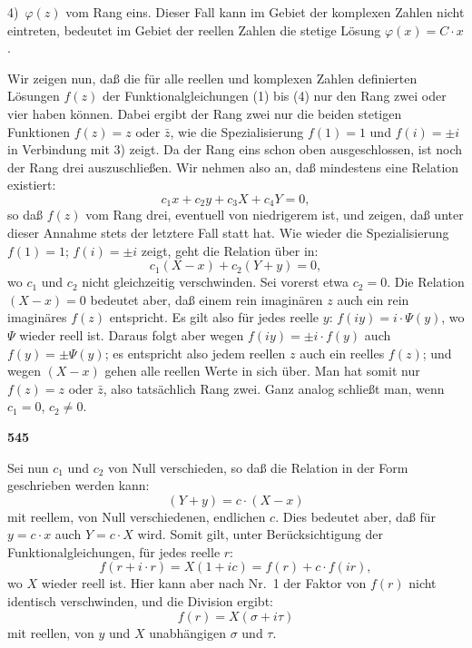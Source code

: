 \documentclass[12pt,a4paper]{article}
\begin{document}
4)\ $\varphi(z)$ vom Rang eins. Dieser Fall kann im Gebiet der komplexen Zahlen nicht eintreten, bedeutet im Gebiet der reellen Zahlen die stetige L\"osung $\varphi(x) = C \cdot x$.

Wir zeigen nun, da\ss{} die f\"ur alle reellen und komplexen Zahlen definierten L\"osungen $f(z)$ der Funktionalgleichungen (1) bis (4) nur den Rang zwei oder vier haben k\"onnen. Dabei ergibt der Rang zwei nur die beiden stetigen Funktionen $f(z) = z$ oder $\bar{z}$, wie die Spezialisierung $f(1) = 1$ und $f(i) = \pm i$ in Verbindung mit 3) zeigt. Da der Rang eins schon oben ausgeschlossen, ist noch der Rang drei auszuschlie\ss en. Wir nehmen also an, da\ss{} mindestens eine Relation existiert:
\[c_1 x + c_2 y + c_3 X + c_4 Y = 0,\]
so da\ss{} $f(z)$ vom Rang drei, eventuell von niedrigerem ist, und zeigen, da\ss{} unter dieser Annahme stets der letztere Fall statt hat. Wie wieder die Spezialisierung $f(1) = 1$; $f(i) = \pm i$ zeigt, geht die Relation \"uber in:
\[c_1(X-x) + c_2(Y+y) = 0,\]
wo $c_1$ und $c_2$ nicht gleichzeitig verschwinden. Sei vorerst etwa $c_2 = 0$. Die Relation $(X-x) = 0$ bedeutet aber, da\ss{} einem rein imagin\"aren $z$ auch ein rein imagin\"ares $f(z)$ entspricht. Es gilt also f\"ur jedes reelle $y$: $f(iy) = i \cdot \Psi(y)$, wo $\Psi$ wieder reell ist. Daraus folgt aber wegen $f(iy) = \pm i \cdot f(y)$ auch $f(y) = \pm \Psi(y)$; es entspricht also jedem reellen $z$ auch ein reelles $f(z)$; und wegen $(X-x)$ gehen alle reellen Werte in sich \"uber. Man hat somit nur $f(z) = z$ oder $\bar{z}$, also tats\"achlich Rang zwei. Ganz analog schlie\ss t man, wenn $c_1 = 0$, $c_2 \neq 0$.

\newpage
\begin{center}
\textbf{545}
\end{center}

Sei nun $c_1$ und $c_2$ von Null verschieden, so da\ss{} die Relation in der Form geschrieben werden kann:
\[(Y+y) = c \cdot (X-x)\]
mit reellem, von Null verschiedenen, endlichen $c$. Dies bedeutet aber, da\ss{} f\"ur $y = c \cdot x$ auch $Y = c \cdot X$ wird. Somit gilt, unter Ber\"ucksichtigung der Funktionalgleichungen, f\"ur jedes reelle $r$:
\[f(r + i \cdot r) = X(1 + ic) = f(r) + c \cdot f(ir),\]
wo $X$ wieder reell ist. Hier kann aber nach Nr.\ 1 der Faktor von $f(r)$ nicht identisch verschwinden, und die Division ergibt:
\[f(r) = X(\sigma + i\tau)\]
mit reellen, von $y$ und $X$ unabh\"angigen $\sigma$ und $\tau$.
\end{document}
